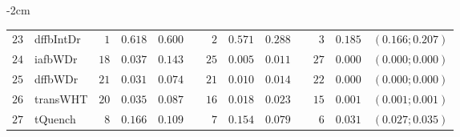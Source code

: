 \begin{table*}[!htbp]
\begin{adjustwidth*}{}{-2cm}
\begin{tabular}{@{}rlrrrrrrrrrcc@{}}
\footnotesize{$23$} & \footnotesize{dffbIntDr} & \footnotesize{$1 $} & \footnotesize{$0.618$} & \footnotesize{$0.600$} && \footnotesize{$2 $} & \footnotesize{$0.571$} & \footnotesize{$0.288$} && \footnotesize{$3 $} & \footnotesize{$0.185$} & \footnotesize{$(0.166;0.207)$} \\
\footnotesize{$24$} & \footnotesize{iafbWDr  } & \footnotesize{$18$} & \footnotesize{$0.037$} & \footnotesize{$0.143$} && \footnotesize{$25$} & \footnotesize{$0.005$} & \footnotesize{$0.011$} && \footnotesize{$27$} & \footnotesize{$0.000$} & \footnotesize{$(0.000;0.000)$} \\
\footnotesize{$25$} & \footnotesize{dffbWDr  } & \footnotesize{$21$} & \footnotesize{$0.031$} & \footnotesize{$0.074$} && \footnotesize{$21$} & \footnotesize{$0.010$} & \footnotesize{$0.014$} && \footnotesize{$22$} & \footnotesize{$0.000$} & \footnotesize{$(0.000;0.000)$} \\
\footnotesize{$26$} & \footnotesize{transWHT } & \footnotesize{$20$} & \footnotesize{$0.035$} & \footnotesize{$0.087$} && \footnotesize{$16$} & \footnotesize{$0.018$} & \footnotesize{$0.023$} && \footnotesize{$15$} & \footnotesize{$0.001$} & \footnotesize{$(0.001;0.001)$} \\
\footnotesize{$27$} & \footnotesize{tQuench  } & \footnotesize{$8 $} & \footnotesize{$0.166$} & \footnotesize{$0.109$} && \footnotesize{$7 $} & \footnotesize{$0.154$} & \footnotesize{$0.079$} && \footnotesize{$6 $} & \footnotesize{$0.031$} & \footnotesize{$(0.027;0.035)$} \\
\bottomrule
\end{tabular}
\end{adjustwidth*}
\end{table*}

